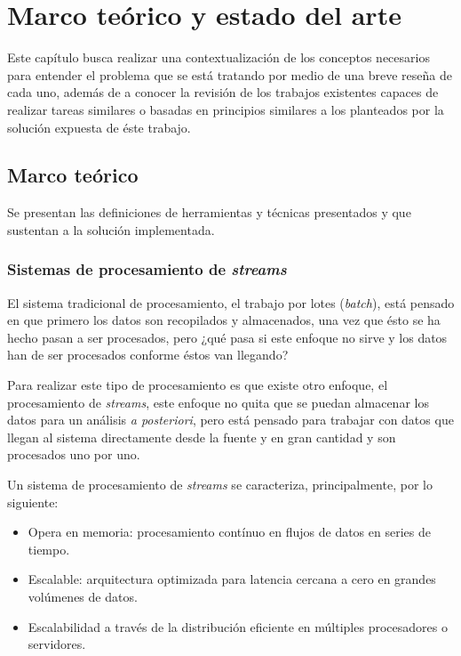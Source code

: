 \chapter{Marco teórico y estado del arte}
\label{cap:MarcTeorico}

Este capítulo busca realizar una contextualización de los conceptos necesarios para entender el problema que se está tratando por medio de una breve reseña de cada uno, además de a conocer la revisión de los trabajos existentes capaces de realizar tareas similares o basadas en principios similares a los planteados por la solución expuesta de éste trabajo.

\section{Marco teórico}
\label{intro:motivacion:marco}

Se presentan las definiciones de herramientas y técnicas presentados y que sustentan a la solución implementada.

\subsection{Sistemas de procesamiento de \textit{streams}}
\label{subsec:SPS}

El sistema tradicional de procesamiento, el trabajo por lotes (\textit{batch}), está pensado en que primero los datos son recopilados y almacenados, una vez que ésto se ha hecho pasan a ser procesados, pero ¿qué pasa si este enfoque no sirve y los datos han de ser procesados conforme éstos van llegando? 

Para realizar este tipo de procesamiento es que existe otro enfoque, el procesamiento de \textit{streams}, este enfoque no quita que se puedan almacenar los datos para un análisis \textit{a posteriori}, pero está pensado para trabajar con datos que llegan al sistema directamente desde la fuente y en gran cantidad y son procesados uno por uno.

Un sistema de procesamiento de \textit{streams} se caracteriza, principalmente, por lo siguiente:

\begin{itemize}
\item Opera en memoria: procesamiento contínuo en flujos de datos en series de tiempo.
\item Escalable: arquitectura optimizada para latencia cercana a cero en grandes volúmenes de datos.
\item Escalabilidad a través de la distribución eficiente en múltiples procesadores o servidores.
\end{itemize}

